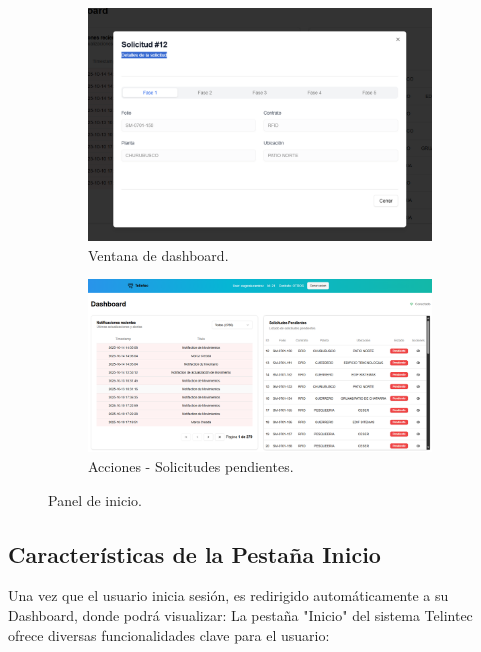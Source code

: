 \begin{figure}[ht!]
\centering
\begin{subfigure}{0.45\textwidth}
    \includegraphics[width=\textwidth]{imgs/Almacen_General/Dashboard/almacen_acciones.png}
    \caption{Ventana de dashboard.}
    \label{fig:dash1}
\end{subfigure}
\hfill
\begin{subfigure}{0.45\textwidth}
    \includegraphics[width=\textwidth]{imgs/Almacen_General/Dashboard/almacen_deahboard.png}
    \caption{Acciones - Solicitudes pendientes.}
    \label{fig:dash2}
\end{subfigure}        
\caption{Panel de inicio.}
\label{fig:dashboard}
\end{figure}



\subsection{Características de la Pestaña Inicio} 
\begin{justify}
    Una vez que el usuario inicia sesión, es redirigido automáticamente a su Dashboard, donde podrá visualizar: 
La pestaña "Inicio" del sistema Telintec ofrece diversas funcionalidades clave para el usuario:
\end{justify}

